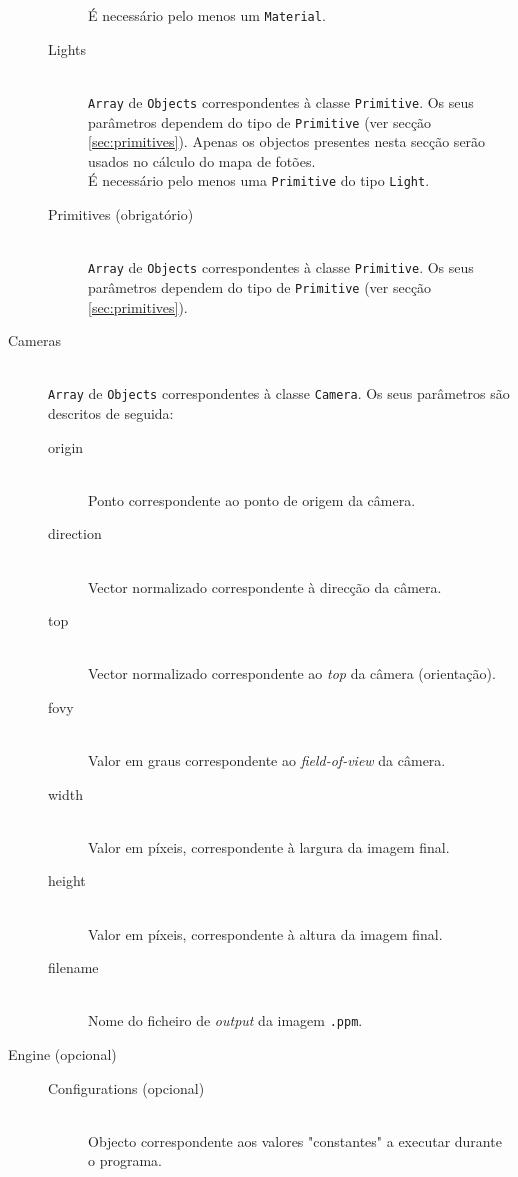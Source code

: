 \documentclass[a4paper]{article}
\begin{document}
\begin{description}
\begin{description}
				É necessário pelo menos um \texttt{Material}.
			\item[Lights] \hfill \\
				\texttt{Array} de \texttt{Objects} correspondentes à classe \texttt{Primitive}.
				Os seus parâmetros dependem do tipo de \texttt{Primitive} (ver secção \ref{sec:primitives}).
				Apenas os objectos presentes nesta secção serão usados no cálculo do mapa de fotões. \\
				É necessário pelo menos uma \texttt{Primitive} do tipo \texttt{Light}.
			\item[Primitives (obrigatório)] \hfill \\
				\texttt{Array} de \texttt{Objects} correspondentes à classe \texttt{Primitive}.
				Os seus parâmetros dependem do tipo de \texttt{Primitive} (ver secção \ref{sec:primitives}).
		\end{description}
	\item[Cameras] \hfill \\
		\texttt{Array} de \texttt{Objects} correspondentes à classe \texttt{Camera}.
		Os seus parâmetros são descritos de seguida:
		\begin{description}
			\item[origin] \hfill \\
				Ponto correspondente ao ponto de origem da câmera.
			\item[direction] \hfill \\
				Vector normalizado correspondente à direcção da câmera.
			\item[top] \hfill \\
				Vector normalizado correspondente ao \emph{top} da câmera (orientação).
			\item[fovy] \hfill \\
				Valor em graus correspondente ao \textit{field-of-view} da câmera.
			\item[width] \hfill \\
				Valor em píxeis, correspondente à largura da imagem final.
			\item[height] \hfill \\
				Valor em píxeis, correspondente à altura da imagem final.
			\item[filename] \hfill \\
				Nome do ficheiro de \textit{output} da imagem \texttt{.ppm}.
		\end{description}

	\item[Engine (opcional)] \hfill
		\begin{description}
			\item[Configurations (opcional)] \hfill \\
				Objecto correspondente aos valores "constantes" a executar durante o programa.
		\end{description}
\end{description}
\end{document}
